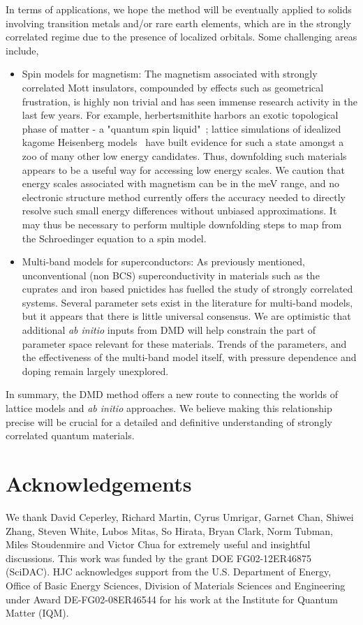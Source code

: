 In terms of applications, we hope the method will be eventually applied to solids involving transition 
metals and/or rare earth elements, which are in the strongly correlated regime due to the presence of localized orbitals. 
Some challenging areas include,
\begin{itemize} 
	\item Spin models for magnetism: 
	The magnetism associated with strongly correlated Mott insulators, compounded by effects such as geometrical frustration, 
	is highly non trivial and has seen immense research activity in the last few years. 
	For example, herbertsmithite harbors an exotic topological phase of matter - a "quantum spin liquid"~\cite{NormanRMP}; 
	lattice simulations of idealized kagome Heisenberg models~\cite{Yan_Huse_White, Changlani_kagome} have built evidence 
	for such a state amongst a zoo of many other low energy candidates. Thus, 
	downfolding such materials~\cite{Jeschke2013} appears to be a useful way for accessing low energy scales. 
	We caution that energy scales associated with magnetism can be in the meV range, and no electronic structure 
	method currently offers the accuracy needed to directly resolve such small energy differences without unbiased approximations. 
	It may thus be necessary to perform multiple downfolding steps to map from the Schroedinger equation to a spin model.
	\item Multi-band models for superconductors:
	As previously mentioned, unconventional (non BCS) superconductivity in materials such as the cuprates and iron based 
	pnictides has fuelled the study of strongly correlated systems.
	Several parameter sets exist in the literature for multi-band models, but it appears that there is little universal consensus. 
	We are optimistic that additional \textit{ab initio} inputs from DMD will help constrain the part of parameter 
	space relevant for these materials. Trends of the parameters, and the effectiveness of the multi-band model itself, 
	with pressure dependence and doping remain largely unexplored.  
\end{itemize} 
In summary, the DMD method offers a new route to connecting the worlds of lattice models and \textit{ab initio} approaches. 
We believe making this relationship precise will be crucial for a detailed and definitive 
understanding of strongly correlated quantum materials. 

\section{Acknowledgements} 
We thank  David Ceperley,  Richard Martin, Cyrus Umrigar,  Garnet Chan,  Shiwei Zhang, Steven White,  
Lubos Mitas, So Hirata, Bryan Clark, Norm Tubman, Miles Stoudenmire and Victor Chua for extremely useful and insightful discussions. 
This work was funded by the grant DOE FG02-12ER46875 (SciDAC). HJC acknowledges support from the U.S. Department of Energy, 
Office of Basic Energy Sciences, Division of Materials Sciences and Engineering under Award DE-FG02-08ER46544 for his work at the Institute for Quantum Matter (IQM). 

